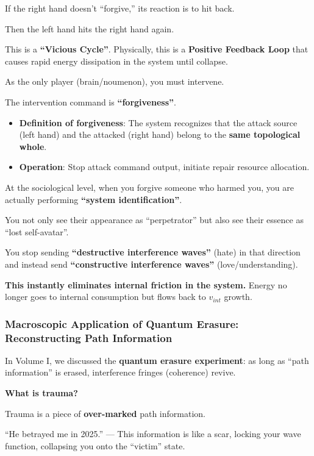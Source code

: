 If the right hand doesn't ``forgive,'' its reaction is to hit back.

Then the left hand hits the right hand again.

This is a \textbf{``Vicious Cycle''}. Physically, this is a \textbf{Positive Feedback Loop} that causes rapid energy dissipation in the system until collapse.

As the only player (brain/noumenon), you must intervene.

The intervention command is \textbf{``forgiveness''}.

\begin{itemize}
\item \textbf{Definition of forgiveness}: The system recognizes that the attack source (left hand) and the attacked (right hand) belong to the \textbf{same topological whole}.

\item \textbf{Operation}: Stop attack command output, initiate repair resource allocation.
\end{itemize}

At the sociological level, when you forgive someone who harmed you, you are actually performing \textbf{``system identification''}.

You not only see their appearance as ``perpetrator'' but also see their essence as ``lost self-avatar''.

You stop sending \textbf{``destructive interference waves''} (hate) in that direction and instead send \textbf{``constructive interference waves''} (love/understanding).

\textbf{This instantly eliminates internal friction in the system.} Energy no longer goes to internal consumption but flows back to $v_{int}$ growth.

\subsubsection{Macroscopic Application of Quantum Erasure: Reconstructing Path Information}

In Volume I, we discussed the \textbf{quantum erasure experiment}: as long as ``path information'' is erased, interference fringes (coherence) revive.

\textbf{What is trauma?}

Trauma is a piece of \textbf{over-marked} path information.

``He betrayed me in 2025.'' --- This information is like a scar, locking your wave function, collapsing you onto the ``victim'' state.

